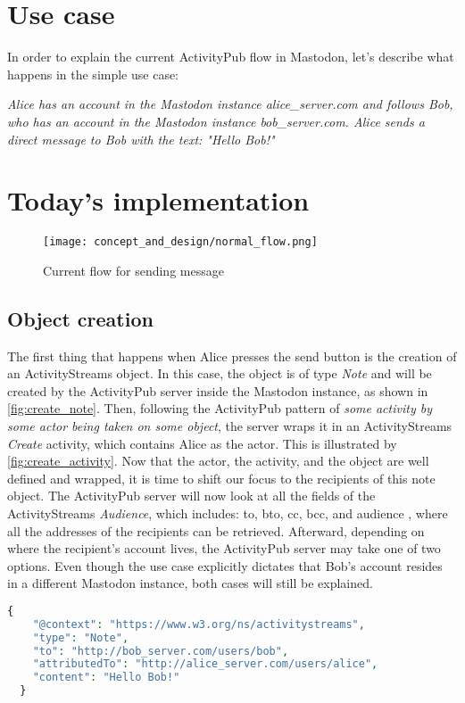 \section{Use case}\label{section:use case}
In order to explain the current ActivityPub flow in Mastodon, let's describe what happens in the simple use case:

\emph{Alice has an account in the Mastodon instance alice\_server.com and follows Bob, who has an account in the Mastodon instance bob\_server.com. Alice sends a direct message to Bob with the text: "Hello Bob!" }

\section{Today's implementation}

\begin{figure}[h]
  \centering
  \texttt{[image: concept\_and\_design/normal\_flow.png]}
  \caption{Current flow for sending message}
  \label{fig:normal_flow}
\end{figure}

\subsection{Object creation}
The first thing that happens when Alice presses the send button is the creation of an ActivityStreams object. In this case, the object is of type \emph{Note} and will be created by the ActivityPub server inside the Mastodon instance, as shown in \ref{fig:create_note}. Then, following the ActivityPub pattern of \emph{some activity by some actor being taken on some object}, the server wraps it in an ActivityStreams \emph{Create} activity, which contains Alice as the actor. This is illustrated by \ref{fig:create_activity}. Now that the actor, the activity, and the object are well defined and wrapped, it is time to shift our focus to the recipients of this note object. 
The ActivityPub server will now look at all the fields of the ActivityStreams \emph{Audience}, which includes: to, bto, cc, bcc, and audience \cite{snell_prodromou_2017}, where all the addresses of the recipients can be retrieved. Afterward, depending on where the recipient's account lives, the ActivityPub server may take one of two options. Even though the use case explicitly dictates that Bob's account resides in a different Mastodon instance, both cases will still be explained.

\lstset{style=JSONStyle}
\begin{lstlisting}[language=PHP, caption=ActivityStreams note object, label=fig:create_note]
  {
    "@context": "https://www.w3.org/ns/activitystreams",
    "type": "Note",
    "to": "http://bob_server.com/users/bob",
    "attributedTo": "http://alice_server.com/users/alice",
    "content": "Hello Bob!"
  }
\end{lstlisting}

